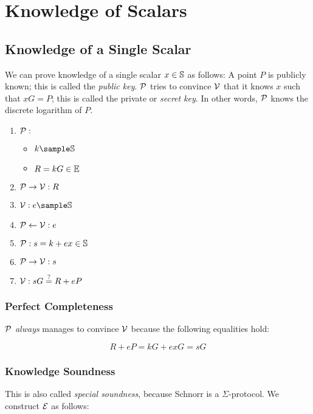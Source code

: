 \section{Knowledge of Scalars}

\subsection{Knowledge of a Single Scalar}

We can prove knowledge of a single scalar $x \in \mathbb{S}$ as follows:
%
A point $P$ is publicly known; this is called the \emph{public key}.
$\mathcal{P}$ tries to convince $\mathcal{V}$ that it knows $x$ such that $xG = P$;
this is called the private or \emph{secret key}.
In other words,
$\mathcal{P}$ knows the discrete logarithm of $P$.

\begin{enumerate}
    \item $\mathcal{P}:$
        \begin{itemize}
            \item $k \sample \scalars$
            \item $R = kG \in \mathbb{E}$
        \end{itemize}
    \item $\mathcal{P} \to \mathcal{V}: R$
    \item \hfill $\verifier: e \sample \scalars$
    \item \hfill $\mathcal{P} \leftarrow \mathcal{V}: e$
    \item $\mathcal{P}: s = k + ex \in \mathbb{S}$
    \item $\mathcal{P} \to \mathcal{V}: s$
    \item \hfill $\mathcal{V}: sG \overset{?}{=} R + eP$
\end{enumerate}

\subsubsection{Perfect Completeness}

$\mathcal{P}$ \emph{always} manages to convince $\mathcal{V}$ because the following equalities hold:

\[
    R + eP = kG + exG = sG
\]

\subsubsection{Knowledge Soundness}

This is also called \emph{special soundness},
because Schnorr is a $\Sigma$-protocol.
%
We construct $\mathcal{E}$ as follows:


